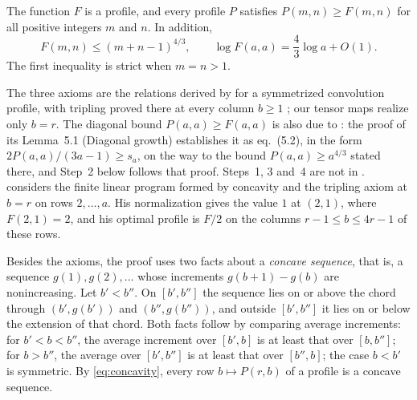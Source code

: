 \begin{theorem}\label{thm:least-profile}
The function \(F\) is a profile, and every profile \(P\) satisfies
\(P(m,n)\ge F(m,n)\) for all positive integers \(m\) and \(n\). In
addition,
\begin{equation}\label{eq:profile-upper}
 F(m,n)\le(m+n-1)^{4/3},\qquad
 \log F(a,a)=\frac43\log a+O(1).
\end{equation}
The first inequality is strict when \(m=n>1\).
\end{theorem}

The three axioms are the relations derived by \citet[eqs.~(4.5), (4.6)
and~(4.9)]{OAI26} for a symmetrized convolution profile, with tripling
proved there at every column \(b\ge1\) \citep[Lemma~4.2]{OAI26}; our
tensor maps realize only \(b=r\). The diagonal bound
\(P(a,a)\ge F(a,a)\) is also due to \citet{OAI26}: the proof of its
Lemma~5.1 (Diagonal growth) establishes it as eq.~(5.2), in the form
\(2P(a,a)/(3a-1)\ge s_a\), on the way to the bound \(P(a,a)\ge a^{4/3}\)
stated there, and Step~2 below follows that proof. Steps~1, 3 and~4 are
not in \citet{OAI26}. \citet[Section~4.3]{Fil26} considers the finite
linear program formed by concavity and the tripling axiom at \(b=r\) on
rows \(2,\ldots,a\). His normalization gives the value \(1\) at
\((2,1)\), where \(F(2,1)=2\), and his optimal profile
\citep[eq.~(4.6)]{Fil26} is \(F/2\) on the columns \(r-1\le b\le4r-1\)
of these rows.

Besides the axioms, the proof uses two facts about a \emph{concave
sequence}, that is, a sequence \(g(1),g(2),\ldots\) whose increments
\(g(b+1)-g(b)\) are nonincreasing. Let \(b'<b''\). On \([b',b'']\) the
sequence lies on or above the chord through \((b',g(b'))\) and
\((b'',g(b''))\), and outside \([b',b'']\) it lies on or below the
extension of that chord. Both facts follow by comparing average
increments: for \(b'<b<b''\), the average increment over \([b',b]\) is
at least that over \([b,b'']\); for \(b>b''\), the average over
\([b',b'']\) is at least that over \([b'',b]\); the case \(b<b'\) is
symmetric. By \eqref{eq:concavity},
every row \(b\mapsto P(r,b)\) of a profile is a concave sequence.

